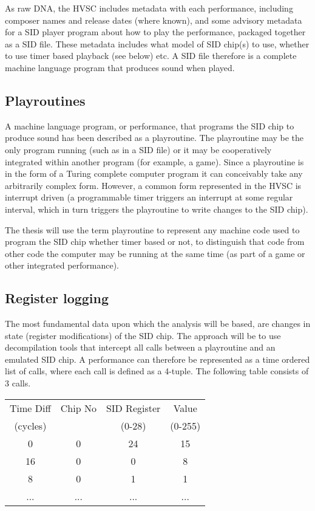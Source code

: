 \documentclass[10pt]{article}
\begin{document}
\begin{multicols*}{2}
  As raw DNA, the HVSC includes metadata with each performance,
  including composer names and release dates (where known), and some
  advisory metadata for a SID player program about how to play the
  performance, packaged together as a SID file. These metadata
  includes what model of SID chip(s) to use, whether to use timer
  based playback (see below) etc. A SID file therefore is a complete
  machine language program that produces sound when played.

  \subsection{Playroutines}
  A machine language program, or performance, that programs the SID
  chip to produce sound has been described as a playroutine.  The
  playroutine may be the only program running (such as in a SID file)
  or it may be cooperatively integrated within another program (for
  example, a game). Since a playroutine is in the form of a Turing
  complete computer program it can conceivably take any arbitrarily
  complex form. However, a common form represented in the HVSC is
  interrupt driven (a programmable timer triggers an interrupt at some
  regular interval, which in turn triggers the playroutine to write
  changes to the SID chip).

  The thesis will use the term playroutine to represent any machine
  code used to program the SID chip whether timer based or not, to
  distinguish that code from other code the computer may be running at
  the same time (as part of a game or other integrated performance).

  \subsection{Register logging}
  The most fundamental data upon which the analysis will be based,
  are changes in state (register modifications) of the SID chip. The
  approach will be to use decompilation tools that intercept all calls
  between a playroutine and an emulated SID chip. A performance can
  therefore be represented as a time ordered list of calls, where each
  call is defined as a 4-tuple. The following table consists of 3 calls.

    \begin{tabular}{|c|c|c|c|}
        \hline
        \rule[-1ex]{0pt}{2.5ex} Time Diff & Chip No & SID Register & Value \\
        \rule[-1ex]{0pt}{2.5ex} (cycles) & & (0-28) & (0-255) \\
        \hline
        \rule[-1ex]{0pt}{2.5ex} 0 & 0 & 24 & 15 \\
        \hline
        \rule[-1ex]{0pt}{2.5ex} 16 & 0 & 0 & 8 \\
        \hline
        \rule[-1ex]{0pt}{2.5ex} 8 & 0 & 1 & 1 \\
        \hline
        \rule[-1ex]{0pt}{2.5ex} ... & ... & ... & ... \\
        \hline
    \end{tabular}


\end{multicols*}
\end{document}
